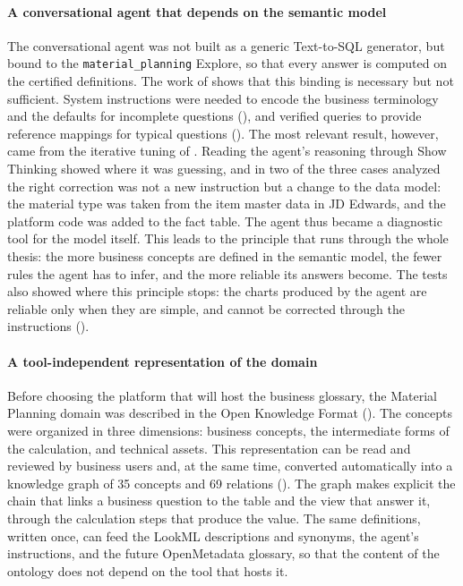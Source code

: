 \paragraph{A conversational agent that depends on the semantic model}
The conversational agent was not built as a generic Text-to-SQL generator, but bound to the \texttt{material\_planning} Explore, so that every answer is computed on the certified definitions. The work of  shows that this binding is necessary but not sufficient. System instructions were needed to encode the business terminology and the defaults for incomplete questions (), and verified queries to provide reference mappings for typical questions (). The most relevant result, however, came from the iterative tuning of . Reading the agent's reasoning through Show Thinking showed where it was guessing, and in two of the three cases analyzed the right correction was not a new instruction but a change to the data model: the material type was taken from the item master data in JD Edwards, and the platform code was added to the fact table. The agent thus became a diagnostic tool for the model itself. This leads to the principle that runs through the whole thesis: the more business concepts are defined in the semantic model, the fewer rules the agent has to infer, and the more reliable its answers become. The tests also showed where this principle stops: the charts produced by the agent are reliable only when they are simple, and cannot be corrected through the instructions ().

\paragraph{A tool-independent representation of the domain}
Before choosing the platform that will host the business glossary, the Material Planning domain was described in the Open Knowledge Format (). The concepts were organized in three dimensions: business concepts, the intermediate forms of the calculation, and technical assets. This representation can be read and reviewed by business users and, at the same time, converted automatically into a knowledge graph of 35 concepts and 69 relations (). The graph makes explicit the chain that links a business question to the table and the view that answer it, through the calculation steps that produce the value. The same definitions, written once, can feed the LookML descriptions and synonyms, the agent's instructions, and the future OpenMetadata glossary, so that the content of the ontology does not depend on the tool that hosts it.

